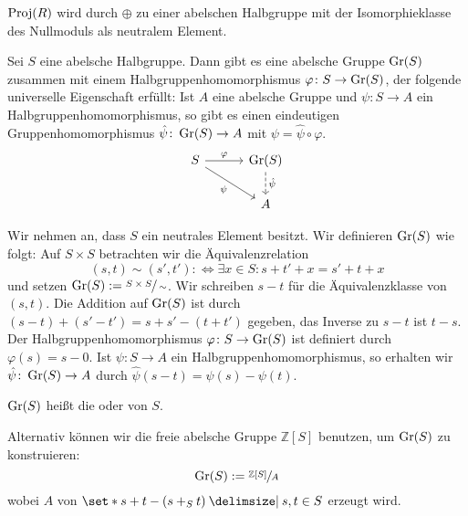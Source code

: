 \begin{bemerkung}
	$\operatorname{Proj}(R)$ wird durch $\oplus$ zu einer abelschen Halbgruppe mit der Isomorphieklasse des Nullmoduls als neutralem Element.
\end{bemerkung}

\begin{satz}[name={Grothendiek-Konstruktion}]
	Sei $S$ eine abelsche Halbgruppe.
	Dann gibt es eine abelsche Gruppe $\operatorname{Gr}(S)$ zusammen mit einem Halbgruppenhomomorphismus $\varphi \colon S\to \operatorname{Gr}(S)$, der folgende universelle Eigenschaft erfüllt:
	Ist $A$ eine abelsche Gruppe und $\psi \colon S \to A$ ein Halbgruppenhomomorphismus, so gibt es einen eindeutigen Gruppenhomomorphismus $\hat{\psi} \colon \operatorname{Gr}(S) \to A$ mit $\psi = \hat{\psi} \circ \varphi$.
	\[
		\begin{tikzcd}[column sep=3em]
			S \rar["\varphi"] \drar["\psi"'] & \Gr(S) \dar[dashed,"\hat{\psi}"] \\
			& A
		\end{tikzcd}
	\]
\end{satz}
\begin{beweis}
	Wir nehmen an, dass $S$ ein neutrales Element besitzt.
	Wir definieren $\operatorname{Gr}(S)$ wie folgt: Auf $S \times S$ betrachten wir die Äquivalenzrelation 
	\[
		(s,t) \sim (s',t') :\iff \exists x \in S : s +t' + x = s'+t +x
	\] 
	und setzen $\operatorname{Gr}(S) := \sfrac{S\times S}{\sim}$.
	Wir schreiben $s-t$ für die Äquivalenzklasse von $(s,t)$.
	Die Addition auf $\operatorname{Gr}(S)$ ist durch $(s-t) + (s'-t') = s+s'  - (t+t')$ gegeben, das Inverse zu $s-t$ ist $t-s$.
	Der Halbgruppenhomomorphismus $\varphi \colon S \to \operatorname{Gr}(S)$ ist definiert durch $\varphi(s)= s - 0$.
	Ist $\psi \colon S \to A$ ein Halbgruppenhomomorphismus, so erhalten wir $\hat{\psi} \colon \operatorname{Gr}(S) \to A$ durch $\hat{\psi}(s-t) = \psi(s)- \psi(t)$.
\end{beweis}

\begin{definition}[{name=[{Grothendiek-Gruppe}]}]
	$\operatorname{Gr}(S)$ heißt die  oder  von $S$.  
\end{definition}

\begin{bemerkung}[{name=[alternative Konstruktion]}]
	Alternativ können wir die freie abelsche Gruppe $\mathbb{Z}[S]$ benutzen, um $\operatorname{Gr}(S)$ zu konstruieren:
	\[
		\operatorname{Gr}(S) := \sfrac{\mathbb{Z}[S]}{A}
	\]
	wobei $A$ von $\set*{s + t-(s +_S t) \given s,t \in S}$ erzeugt wird.
\end{bemerkung}

